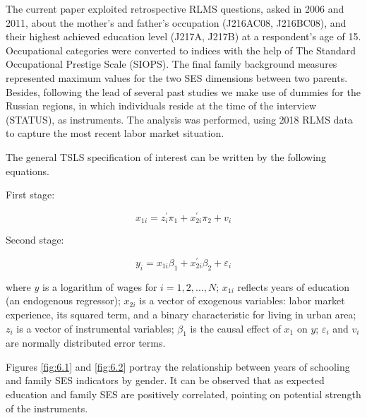 \documentclass[alpha-refs]{wiley-article-01g}
\begin{document}
The current paper exploited retrospective RLMS questions, asked in 2006 and 2011, about the mother's and father's occupation (J216AC08, J216BC08), and their highest achieved education level (J217A, J217B) at a respondent's age of 15. Occupational categories were converted to indices with the help of The Standard Occupational Prestige Scale (SIOPS). The final family background measures represented maximum values for the two SES dimensions between two parents. Besides, following the lead of several past studies \parencite[e.g.,][]{Angrist1991, Card1999, Kim2019} we make use of dummies for the Russian regions, in which individuals reside at the time of the interview (STATUS), as instruments. The analysis was performed, using 2018 RLMS data to capture the most recent labor market situation.

The general TSLS specification of interest can be written by the following equations.

First stage:

\begin{equation}
x_{1i}=z_{i}^{\prime} \pi_{1}+x_{2i}^{\prime} \pi_{2}+v_{i}
\end{equation}

Second stage:

\begin{equation}
y_{i}=x_{1 i} \beta_{1}+x_{2i}^{\prime} \beta_{2}+\varepsilon_{i}
\end{equation}

\noindent
where $y$ is a logarithm of wages for $i = 1,2,...,N$; $x_{1i}$ reflects years of education (an endogenous regressor); $x_{2i}$ is a vector of exogenous variables: labor market experience, its squared term, and a binary characteristic for living in urban area; $z_{i}$ is a vector of instrumental variables; $\beta_{1}$ is the causal effect of $x_{1}$ on $y$; $\varepsilon_{i}$ and $v_{i}$ are normally distributed error terms.

Figures \ref{fig:6.1} and \ref{fig:6.2} portray the relationship between years of schooling and family SES indicators by gender. It can be observed that as expected education and family SES are positively correlated, pointing on potential strength of the instruments.
\end{document}
